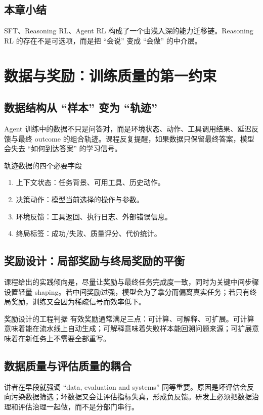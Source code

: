 \documentclass[a4paper]{article}
\begin{document}
\subsection{本章小结}
SFT、Reasoning RL、Agent RL 构成了一个由浅入深的能力迁移链。Reasoning RL 的存在不是可选项，而是把 ``会说'' 变成 ``会做'' 的中介层。


\section{数据与奖励：训练质量的第一约束}

\subsection{数据结构从 ``样本'' 变为 ``轨迹''}
Agent 训练中的数据不只是问答对，而是环境状态、动作、工具调用结果、延迟反馈与最终 outcome 的组合轨迹。课程反复提醒，如果数据只保留最终答案，模型会失去 ``如何到达答案'' 的学习信号。

\begin{knowledgebox}{轨迹数据的四个必要字段}
\begin{enumerate}
    \item 上下文状态：任务背景、可用工具、历史动作。
    \item 决策动作：模型当前选择的操作与参数。
    \item 环境反馈：工具返回、执行日志、外部错误信息。
    \item 终局标签：成功/失败、质量评分、代价统计。
\end{enumerate}
\end{knowledgebox}

\subsection{奖励设计：局部奖励与终局奖励的平衡}
课程给出的实践倾向是，尽量让奖励与最终任务完成度一致，同时为关键中间步骤设置轻量 shaping。若中间奖励过强，模型会为了拿分而偏离真实任务；若只有终局奖励，训练又会因为稀疏信号而效率低下。

\begin{importantbox}{奖励设计的工程判据}
有效奖励通常满足三点：可计算、可解释、可扩展。可计算意味着能在流水线上自动生成；可解释意味着失败样本能回溯问题来源；可扩展意味着在新任务上不需要全部重写。
\end{importantbox}

\subsection{数据质量与评估质量的耦合}
讲者在早段就强调 ``data, evaluation and systems'' 同等重要。原因是坏评估会反向污染数据筛选；坏数据又会让评估指标失真，形成负反馈。研发上必须把数据治理和评估治理一起做，而不是分部门串行。
\end{document}
